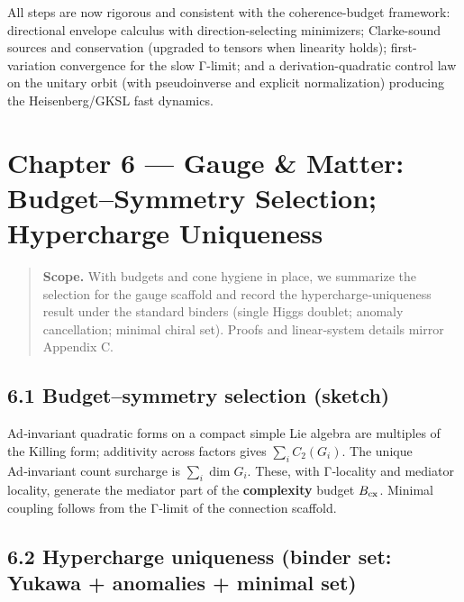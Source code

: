 \documentclass[
]{article}
\numberwithin{equation}{section}
\begin{document}
All steps are now rigorous and consistent with the coherence-budget
framework: directional envelope calculus with direction-selecting
minimizers; Clarke-sound sources and conservation (upgraded to tensors
when linearity holds); first-variation convergence for the slow Γ-limit;
and a derivation-quadratic control law on the unitary orbit (with
pseudoinverse and explicit normalization) producing the Heisenberg/GKSL
fast dynamics.

\hypertarget{chapter-6-gauge-matter-budgetsymmetry-selection-hypercharge-uniqueness}{%
\section{Chapter 6 --- Gauge \& Matter: Budget--Symmetry Selection;
Hypercharge
Uniqueness}\label{chapter-6-gauge-matter-budgetsymmetry-selection-hypercharge-uniqueness}}

\begin{quote}
\textbf{Scope.} With budgets and cone hygiene in place, we summarize the
selection for the gauge scaffold and record the hypercharge‑uniqueness
result under the standard binders (single Higgs doublet; anomaly
cancellation; minimal chiral set). Proofs and linear‑system details
mirror Appendix C.
\end{quote}

\hypertarget{budgetsymmetry-selection-sketch}{%
\subsection{6.1 Budget--symmetry selection
(sketch)}\label{budgetsymmetry-selection-sketch}}

Ad‑invariant quadratic forms on a compact simple Lie algebra are
multiples of the Killing form; additivity across factors gives
\(\sum_i C_2(G_i)\). The unique Ad‑invariant count surcharge is
\(\sum_i\dim G_i\). These, with Γ‑locality and mediator locality,
generate the mediator part of the \textbf{complexity} budget
\(B_{\rm cx}\). Minimal coupling follows from the Γ‑limit of the
connection scaffold.

\hypertarget{hypercharge-uniqueness-binder-set-yukawa-anomalies-minimal-set}{%
\subsection{6.2 Hypercharge uniqueness (binder set: Yukawa + anomalies +
minimal
set)}\label{hypercharge-uniqueness-binder-set-yukawa-anomalies-minimal-set}}
\end{document}
